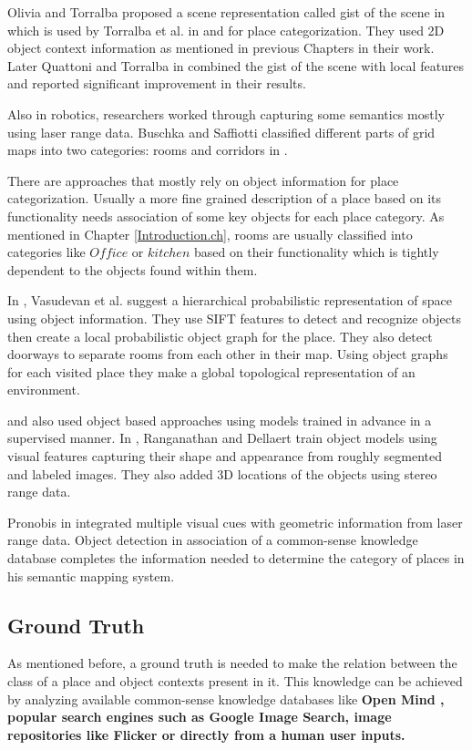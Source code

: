  Olivia and Torralba proposed a scene representation called gist of the scene in \cite{oliva2006building} which is 
 used by Torralba et al. in \cite{TorralbaContextualPriming} and \cite{TrollbaContexBased} for place categorization.
 They used 2D object context information as mentioned in previous Chapters in their work.
 Later Quattoni and Torralba in \cite{quattoni2009recognizing} combined the gist of the scene with local features and 
 reported significant improvement in their results.
 
 Also in robotics, researchers worked through capturing some semantics mostly using laser range data.
 Buschka and Saffiotti classified different parts of grid maps into two categories: rooms and corridors in \cite{buschka2002virtual}. 
 
 There are approaches that mostly rely on object information for place categorization.
 Usually a more fine grained description of a place based on its functionality needs association of some key objects 
 for each place category.
 As mentioned in Chapter \ref{Introduction.ch}, rooms are usually classified into categories like $Office$ or 
 $kitchen$ based on their functionality which is tightly dependent to the objects found within them.
 
In \cite{Vasudevan2007359}, Vasudevan et al. suggest a hierarchical probabilistic representation of space using object
information. 
They use SIFT features to detect and recognize objects then create a local probabilistic object graph for the place. 
They also detect doorways to separate rooms from each other in their map. 
Using object graphs for each visited place they make a global topological representation of an environment.

\cite{ranganathan2007semantic} and \cite{P.Viswanathan} also used object based approaches using models trained in 
advance in a supervised manner. 
In \cite{ranganathan2007semantic}, Ranganathan and Dellaert train object models using visual features capturing their 
shape and appearance from roughly segmented and labeled images. 
They also added 3D locations of the objects using stereo range data.
 
Pronobis in \cite{pronobis2011phd} integrated multiple visual cues with geometric information from laser range data. 
Object detection in association of a common-sense knowledge database completes the information needed to determine the category of places in his semantic mapping system.
 
\subsection{Ground Truth}
\label{GroundTruth.sec}
As mentioned before, a ground truth is needed to make the relation between the class of a place and object contexts 
present in it.
This knowledge can be achieved by analyzing available common-sense knowledge databases like \bf{Open Mind} \cite{OpenMind}, 
popular search engines such as Google Image Search, image repositories like Flicker or directly from a human user 
inputs. 

